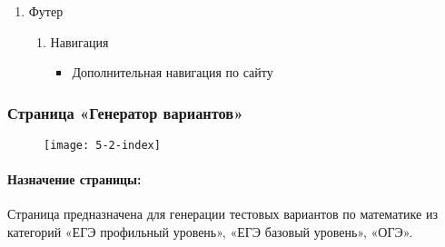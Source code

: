 \begin{enumerate}
	\item Футер
	\begin{enumerate}
		\item Навигация
		\begin{itemize}
			\item Дополнительная навигация по сайту
		\end{itemize}
	\end{enumerate}
\end{enumerate}


\subsubsection{Страница «Генератор вариантов»}
\begin{figure}[H]
	\texttt{[image: 5-2-index]}
\end{figure}
\paragraph{Назначение страницы:} Страница предназначена для генерации тестовых вариантов по математике из категорий «ЕГЭ профильный уровень», «ЕГЭ базовый уровень», «ОГЭ».

